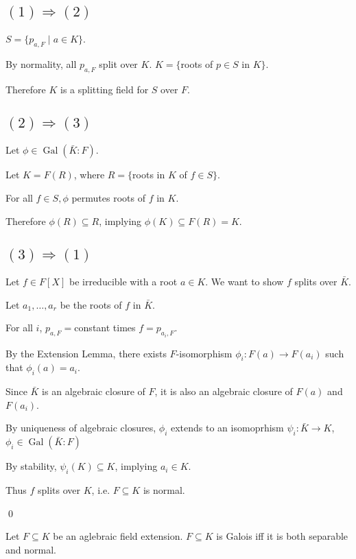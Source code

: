 \documentclass[x11names,reqno,14pt]{extarticle}
\DeclareMathOperator{\Gal}{Gal}
\begin{document}
\proof\,

\subsection*{$(1)\Rightarrow(2)$}

$S = \{p_{a, F} \mid a \in K\}$. 

By normality, all $p_{a, F}$ split over $K$. $K = \{$roots of $p\in S$ in $K\}$. 

Therefore $K$ is a splitting field for $S$ over $F$. 

\subsection*{$(2)\Rightarrow(3)$}

Let $\phi\in \Gal(\bar{K}:F)$. 

Let $K = F(R)$, where $R = \{$roots in $K$ of $f\in S\}$. 

For all $f \in S, \phi$ permutes roots of $f$ in $K$. 

Therefore $\phi(R) \subseteq R$, implying $\phi(K) \subseteq F(R) = K$. 

\subsection*{$(3)\Rightarrow(1)$}

Let $f \in F[X]$ be irreducible with a root $a \in K$. We want to show $f$ splits over $\bar{K}$. 

Let $a_1, \dots, a_r$ be the roots of $f$ in $\bar{K}$. 

For all $i$, $p_{a, F} = $constant times $f = p_{a_i, F}$. 

By the Extension Lemma, there exists $F$-isomorphism $\phi_i:F(a)\to F(a_i)$ such that $\phi_i(a) = a_i$. 

Since $\bar{K}$ is an algebraic closure of $F$, it is also an algebraic closure of $F(a)$ and $F(a_i)$. 

By uniqueness of algebraic closures, $\phi_i$ extends to an isomoprhism $\psi_i:\bar{K}\to K$, $\phi_i\in\Gal(\bar{K}:F)$

By stability, $\psi_i(K) \subseteq K$, implying $a_i \in K$. 

Thus $f$ splits over $K$, i.e. $F \subseteq K$ is normal. 

\qed

\thm

Let $F \subseteq K$ be an aglebraic field extension. $F \subseteq K$ is Galois iff it is both separable and normal. 
\end{document}
